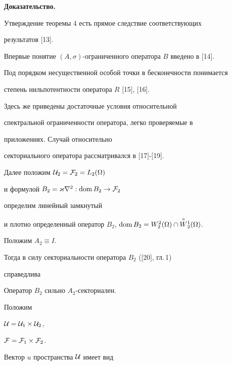 {\bf Доказательство.} 


Утверждение теоремы 4 есть прямое следствие соответствующих


результатов [13].





\begin{note}


Впервые понятие $(A,\sigma)$-ограниченного оператора $B$ введено в [14].


Под порядком несущественной особой точки в бесконечности понимается


степень нильпотентности оператора $R$ [15], [16]. 


Здесь же приведены достаточные условия относительной 


спектральной ограниченности оператора, легко проверяемые в


приложениях. Случай относительно 


секториального оператора рассматривался в [17]-[19].


\end{note}





Далее положим ${\cal U}_2={\cal F}_2=L_2(\Omega)$ 


и формулой $B_2=\varkappa {\nabla}^2:\operatorname{dom} B_2\to {\cal F}_2$


определим линейный замкнутый


и плотно определенный оператор $B_2$, $\dom B_2=


W_2^2(\Omega) \cap \up{\circ}{W}_2^1(\Omega)$.


Положим $A_2 \equiv I$.


Тогда в силу секториальности оператора $B_2$ ([20], гл.\,1)


справедлива





\begin{thm}


Оператор $B_2$ сильно $A_2$-секториален.


\end{thm}





Положим


${\cal U}={\cal U}_1 \times {\cal U}_2$,


${\cal F}={\cal F}_1 \times {\cal F}_2$.


Вектор $u$ пространства ${\cal U}$ имеет вид



